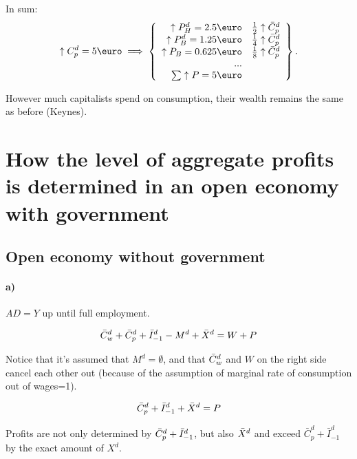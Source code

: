 \documentclass{report}
\begin{document}
In sum: 
\begin{align}
    \uparrow C^d_p=5\text{\euro} \implies \left\{\begin{array}{rr}
        \uparrow P^d_H=2.5 \text{\euro} & \frac{1}{2}\uparrow\bar{C}^d_p  \\
        \uparrow P^d_B=1.25\text{\euro} & \frac{1}{4}\uparrow \bar{C}^d_p \\
        \uparrow P_B=0.625\text{\euro}  & \frac{1}{8}\uparrow \bar{C}^d_p \\
        ... \\
        \sum \uparrow P=5\text{\euro}
    \end{array} \right\}. \end{align}

However much capitalists spend on consumption, their wealth remains the same as before (Keynes).

\section{How the level of aggregate profits is determined in an open economy with government}

\subsection{Open economy without government}


\paragraph{a)}

$AD = Y$ up until full employment.

\begin{equation}
 \Bar{C}^d_w +  \Bar{C}^d_p + \Bar{I}_{-1}^d - M^d + \Bar{X}^d = W + P
\end{equation}

Notice that it's assumed that $M^d = \emptyset$, and that $\Bar{C}^d_w$ and $W$ on the right side cancel each other out (because of the assumption of marginal rate of consumption out of wages=1). 

\begin{equation}
    \Bar{C}^d_p + \Bar{I}_{-1}^d + \Bar{X}^d = P %
\end{equation} \label{eq.1}

Profits are not only determined by $\Bar{C}^d_p + \Bar{I}_{-1}^d$, but also $\Bar{X}^d$ and exceed $\bar{C}^d_p+\bar{I}^d_{-1}$ by the exact amount of $X^d$.
\end{document}
